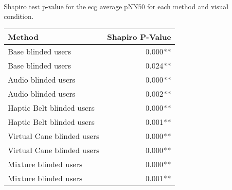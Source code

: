 
\centering
\caption{Shapiro test p-value for the ecg average pNN50 for each method and visual condition.}
\label{tab:shapiro_ecg_pnn50}
\begin{tabular}{lr}
\toprule
                    Method & Shapiro P-Value \\
\midrule
        Base blinded users &         0.000** \\
        Base blinded users &         0.024** \\
       Audio blinded users &         0.000** \\
       Audio blinded users &         0.002** \\
 Haptic Belt blinded users &         0.000** \\
 Haptic Belt blinded users &         0.001** \\
Virtual Cane blinded users &         0.000** \\
Virtual Cane blinded users &         0.000** \\
     Mixture blinded users &         0.000** \\
     Mixture blinded users &         0.001** \\
\bottomrule
\end{tabular}
